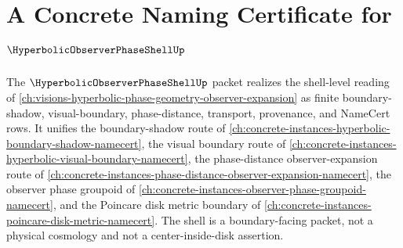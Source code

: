 \chapter{A Concrete Naming Certificate for $\HyperbolicObserverPhaseShellUp$}
\label{ch:concrete-instances-hyperbolic-observer-phase-shell-namecert}

The $\HyperbolicObserverPhaseShellUp$ packet realizes the shell-level reading of \autoref{ch:visions-hyperbolic-phase-geometry-observer-expansion} as finite boundary-shadow, visual-boundary, phase-distance, transport, provenance, and NameCert rows. It unifies the boundary-shadow route of \autoref{ch:concrete-instances-hyperbolic-boundary-shadow-namecert}, the visual boundary route of \autoref{ch:concrete-instances-hyperbolic-visual-boundary-namecert}, the phase-distance observer-expansion route of \autoref{ch:concrete-instances-phase-distance-observer-expansion-namecert}, the observer phase groupoid of \autoref{ch:concrete-instances-observer-phase-groupoid-namecert}, and the Poincare disk metric boundary of \autoref{ch:concrete-instances-poincare-disk-metric-namecert}. The shell is a boundary-facing packet, not a physical cosmology and not a center-inside-disk assertion.

